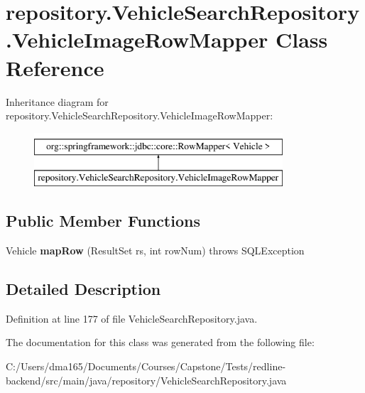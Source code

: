 \hypertarget{classrepository_1_1_vehicle_search_repository_1_1_vehicle_image_row_mapper}{}\section{repository.\+Vehicle\+Search\+Repository.\+Vehicle\+Image\+Row\+Mapper Class Reference}
\label{classrepository_1_1_vehicle_search_repository_1_1_vehicle_image_row_mapper}
Inheritance diagram for repository.\+Vehicle\+Search\+Repository.\+Vehicle\+Image\+Row\+Mapper\+:\begin{figure}[H]
\begin{center}
\leavevmode
\includegraphics[height=2.000000cm]{classrepository_1_1_vehicle_search_repository_1_1_vehicle_image_row_mapper}
\end{center}
\end{figure}
\subsection*{Public Member Functions}
\begin{DoxyCompactItemize}
\item 
\mbox{\label{classrepository_1_1_vehicle_search_repository_1_1_vehicle_image_row_mapper_ad8ca505d91582044d2084eaedadb5a37}} 
Vehicle {\bfseries map\+Row} (Result\+Set rs, int row\+Num)  throws S\+Q\+L\+Exception 
\end{DoxyCompactItemize}


\subsection{Detailed Description}


Definition at line 177 of file Vehicle\+Search\+Repository.\+java.



The documentation for this class was generated from the following file\+:\begin{DoxyCompactItemize}
\item 
C\+:/\+Users/dma165/\+Documents/\+Courses/\+Capstone/\+Tests/redline-\/backend/src/main/java/repository/Vehicle\+Search\+Repository.\+java\end{DoxyCompactItemize}
